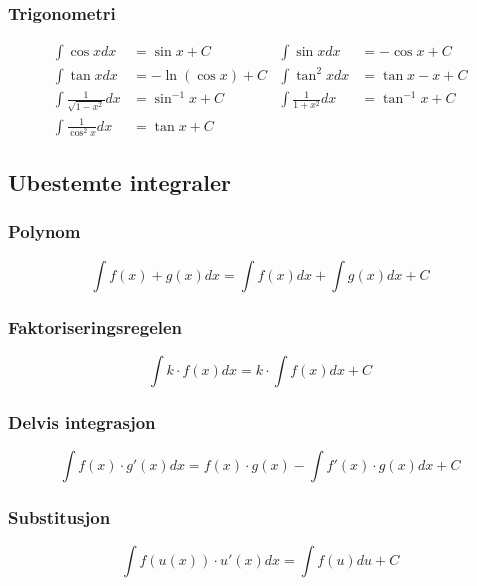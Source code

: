 \documentclass[12pt,norsk,a4paper]{article}
\begin{document}
\subsubsection*{Trigonometri}
\begin{align*}
\int \cos x dx &= \sin x + C	&	\int \sin x dx &= - \cos x + C	\\
\int \tan x dx &= - \ln ( \cos x) + C	&	\int \tan ^{2} x dx &= \tan x - x + C	\\
\int \frac{1}{\sqrt{1 - x^{2}}} dx &= \sin^{-1}x + C	&	\int \frac{1}{1 + x^{2}} dx &= \tan^{-1} x + C	\\
\int \frac{1}{\cos^{2} x} dx &= \tan x + C
\end{align*}

\subsection{Ubestemte integraler}

\subsubsection*{Polynom}
\begin{equation}
\int f(x) + g(x) dx = \int f(x) dx + \int g(x) dx + C
\end{equation}

\subsubsection*{Faktoriseringsregelen}
\begin{equation}
\int k \cdot f(x) dx = k \cdot \int f(x) dx + C
\end{equation}

\subsubsection*{Delvis integrasjon}
\begin{equation}
\int f(x) \cdot g'(x) dx = f(x) \cdot g(x) - \int f'(x) \cdot g(x) dx + C
\end{equation}


\subsubsection*{Substitusjon}
\begin{equation}
\int f(u(x)) \cdot u'(x) dx = \int f(u) du + C
\end{equation}
\end{document}
